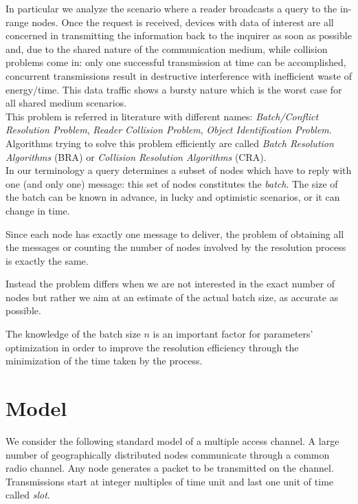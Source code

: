 \documentclass[12pt,a4paper]{report}
\newcommand{\rev}[1]{\textcolor{Cerulean}{#1}}
\begin{document}
In particular we analyze the scenario where a reader broadcasts a query to the in-range nodes. Once the request is received, devices with data of interest are all concerned in transmitting the information back to the inquirer as soon as possible and, due to the shared nature of the communication medium,  while collision problems come in: only one successful transmission at time can be accomplished, concurrent transmissions result in destructive interference with inefficient waste of energy/time. This data traffic shows a bursty nature which is the worst case for all shared medium scenarios.\\

This problem is referred in literature with different names: \emph{Batch/Conflict Resolution Problem}, \emph{Reader Collision Problem}, \emph{Object Identification Problem}.\\
Algorithms trying to solve this problem efficiently  are called \emph{Batch Resolution Algorithms} (BRA) or  \emph{Collision Resolution Algorithms} (CRA).\\ 

In our terminology a query determines a subset of nodes which have to reply with one (and only one) message: this set of nodes constitutes the \emph{batch}. The size of the batch can be known in advance, in lucky and optimistic scenarios, or \rev{it} can change in time.

Since each node has exactly one message to deliver, the problem of obtaining all the messages or counting the number of nodes involved by the resolution process is exactly the same.

\rev{
Instead the problem differs when we are not interested in the exact number of nodes but rather we aim at an estimate of the actual batch size, as accurate as possible.}

\rev{
The knowledge of the batch size $n$ is an important factor for parameters' optimization in order to improve the resolution efficiency  through the minimization of the time taken by the process.\\}

\section{Model}

We consider the following standard model of a multiple access channel. A large number of geographically distributed nodes communicate through a common radio channel. Any node generates a packet to be transmitted on the channel. Transmissions start at integer multiples of  time unit and last one unit of time called \emph{slot}.\\
\end{document}
